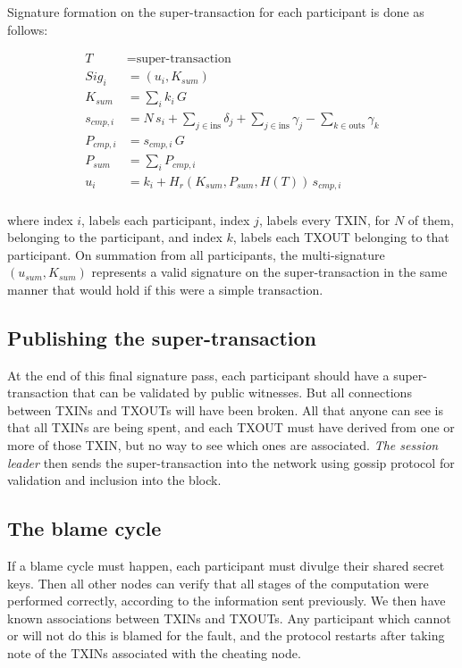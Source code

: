 \documentclass[8pt,fleqn,openany]{book}
\begin{document}
Signature formation on the super-transaction for each participant is done as follows:

\begin{align*}
T &= \text{super-transaction} \\
Sig_i &= (u_i, K_{sum}) \\
K_{sum} &= \sum_i{k_i \, G} \\
s_{cmp,i} &= N \, s_i + \sum_{j \in \text{ins}} {\delta_j} + \sum_{j \in \text{ins}} {\gamma_j} - \sum_{k \in \text{outs}} {\gamma_k} \\
P_{cmp,i} &= s_{cmp,i} \, G \\
P_{sum} &= \sum_i{P_{cmp,i}}\\
u_i &= k_i + H_r(K_{sum} , P_{sum},  H(T)) \,  s_{cmp,i}\\
\end{align*}

where index $i$, labels each participant, index $j$, labels every TXIN, for $N$ of them, belonging to the participant, and index $k$, labels each TXOUT belonging to that participant. On summation from all participants, the multi-signature $(u_{sum}, K_{sum})$ represents a valid signature on the super-transaction in the same manner that would hold if this were a simple transaction.

\subsection{Publishing the super-transaction} 
At the end of this final signature pass, each participant should have a super-transaction that can be validated by public witnesses. But all connections between TXINs and TXOUTs will have been broken. All that anyone can see is that all TXINs are being spent, and each TXOUT must have derived from one or more of those TXIN, but no way to see which ones are associated. \textit{The session leader} then sends the super-transaction into the network using gossip protocol for validation and inclusion into the block.

\subsection{The blame cycle} 
If a blame cycle must happen, each participant must divulge their shared secret keys. Then all other nodes can verify that all stages of the computation were performed correctly, according to the information sent previously. We then have known associations between TXINs and TXOUTs. Any participant which cannot or will not do this is blamed for the fault, and the protocol restarts after taking note of the TXINs associated with the cheating node.
\end{document}
